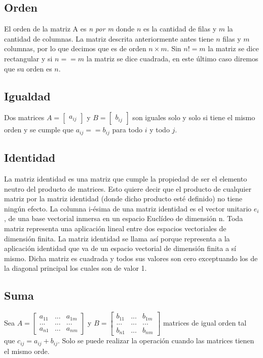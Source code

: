 \subsection{Orden}
El orden de la matriz A es \emph{ n por m } donde $n$ es la cantidad de filas y $m$ la cantidad de columnas. La matriz descrita anteriormente antes tiene $n$ filas y $m$ columnas, por lo que decimos que es de orden $n\times m$. Sin $n != m$ la matriz se dice rectangular y si $n == m$ la matriz se dice cuadrada, en este último caso diremos que su orden es $n$.

\subsection{Igualdad}

Dos matrices $A=\begin{bmatrix} a_{ij} \end{bmatrix}$  y $B=\begin{bmatrix} b_{ij} \end{bmatrix}$ son iguales solo y solo si tiene el mismo orden y se cumple que $a_{ij} == b_{ij}$ para todo $i$ y todo $j$.

\subsection{Identidad}

La matriz identidad es una matriz que cumple la propiedad de ser el elemento neutro del producto de matrices. Esto quiere decir que el producto de cualquier matriz por la matriz identidad (donde dicho producto esté definido) no tiene ningún efecto. La columna i-ésima de una matriz identidad es el vector unitario  $e_{i}$, de una base vectorial inmersa en un espacio Euclídeo de dimensión n. Toda matriz representa una aplicación lineal entre dos espacios vectoriales de dimensión finita. La matriz identidad se llama así porque representa a la aplicación identidad que va de un espacio vectorial de dimensión finita a sí mismo. Dicha matriz es cuadrada y todos sus valores son cero exceptuando los de la diagonal principal los cuales son de valor 1.

\subsection{Suma}

Sea  $A=\begin{bmatrix} a_{11}  & ... & a_{1m} \\ ... & ... & ... \\ a_{n1}  & ... & a_{nm} \end{bmatrix} $ y $B=\begin{bmatrix} b_{11}  & ... & b_{1m} \\ ... & ... & ... \\ b_{n1}  & ... & b_{nm} \end{bmatrix} $ matrices de igual orden tal que $c_{ij} = a_{ij} + b_{ij}$. Solo se puede realizar la operación cuando las matrices tienen el mismo orde.

